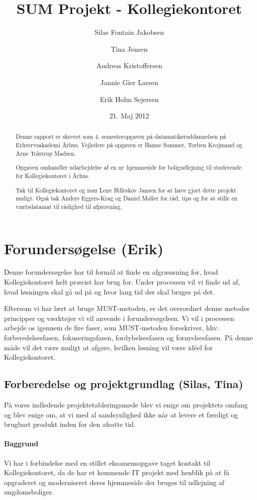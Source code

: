 \documentclass[12pt, a4paper]{report}
\title{SUM Projekt - Kollegiekontoret}
\author{Silas Fontain Jakobsen \and Tina Jensen \and Andreas Kristoffersen \and Jannie Gier Larsen \and Erik Holm Sejersen}
\date{21. Maj 2012}
\begin{document}
\begin{titlepage}
\maketitle
\end{titlepage}

\renewcommand{\abstractname}{Forord}
\begin{abstract}
\thispagestyle{empty}
Denne rapport er skrevet som 4. semesteropgaven på datamatikeruddannelsen på Erhvervsakademi Århus. Vejledere på opgaven er Hanne Sommer, Torben Krøjmand og Arne Tolstrup Madsen.

Opgaven omhandler udarbejdelse af en ny hjemmeside for boligudlejning til studerende for Kollegiekontoret i Århus.

Tak til Kollegiekontoret og især Lene Billeskov Jansen for at have gjort dette projekt muligt. Også tak Anders Eggers-Krag og Daniel Møller for råd, tips og for at stille en værtsdatamat til rådighed til afprøvning.
\end{abstract}

\tableofcontents

\chapter{Forundersøgelse (Erik)}

Denne forundersøgelse har til formål at finde en afgrænsning for, hvad Kollegiekontoret helt præcist har brug for. Under processen vil vi finde ud af, hvad løsningen skal gå ud på og hvor lang tid der skal bruges på det.

Eftersom vi har lært at bruge MUST-metoden, er det overordnet denne metodes principper og værktøjer vi vil anvende i forundersøgelsen. Vi vil i processen arbejde os igennem de fire faser, som MUST-metoden foreskriver, hhv. forberedelsesfasen, fokuseringsfasen, fordybelsesfasen og fornyelsesfasen. På denne måde vil det være muligt at afgøre, hvilken løsning vil være idéel for Kollegiekontoret.

\section{Forberedelse og projektgrundlag (Silas, Tina)}
På vores indledende projektetableringsmøde blev vi enige om projektets omfang og blev enige om, at vi med al sandsynlighed ikke når at levere et færdigt og brugbart produkt inden for den afsatte tid.

\subsubsection{Baggrund}
Vi har i forbindelse med en stillet eksamensopgave taget kontakt til Kollegiekontoret, da de har et kommende IT projekt med henblik på at få opgraderet og moderniseret deres hjemmeside der bruges til udlejning af ungdomsboliger.
\end{document}
